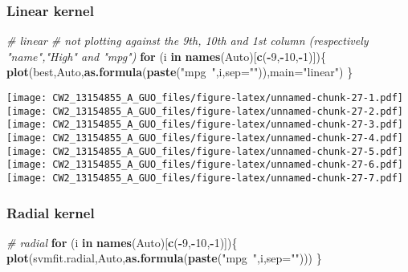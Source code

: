 \documentclass[]{article}
\newenvironment{Shaded}{\begin{snugshade}}{\end{snugshade}}
\newcommand{\KeywordTok}[1]{\textcolor[rgb]{0.13,0.29,0.53}{\textbf{#1}}}
\newcommand{\DataTypeTok}[1]{\textcolor[rgb]{0.13,0.29,0.53}{#1}}
\newcommand{\DecValTok}[1]{\textcolor[rgb]{0.00,0.00,0.81}{#1}}
\newcommand{\StringTok}[1]{\textcolor[rgb]{0.31,0.60,0.02}{#1}}
\newcommand{\CommentTok}[1]{\textcolor[rgb]{0.56,0.35,0.01}{\textit{#1}}}
\newcommand{\ControlFlowTok}[1]{\textcolor[rgb]{0.13,0.29,0.53}{\textbf{#1}}}
\newcommand{\OperatorTok}[1]{\textcolor[rgb]{0.81,0.36,0.00}{\textbf{#1}}}
\newcommand{\NormalTok}[1]{#1}
\begin{document}
\subsubsection{Linear kernel}\label{linear-kernel}

\begin{Shaded}
\begin{Highlighting}[]
\CommentTok{# linear}
\CommentTok{# not plotting against the 9th, 10th and 1st column (respectively "name","High" and "mpg")}
\ControlFlowTok{for}\NormalTok{ (i }\ControlFlowTok{in} \KeywordTok{names}\NormalTok{(Auto)[}\KeywordTok{c}\NormalTok{(}\OperatorTok{-}\DecValTok{9}\NormalTok{,}\OperatorTok{-}\DecValTok{10}\NormalTok{,}\OperatorTok{-}\DecValTok{1}\NormalTok{)])\{}
        \KeywordTok{plot}\NormalTok{(best,Auto,}\KeywordTok{as.formula}\NormalTok{(}\KeywordTok{paste}\NormalTok{(}\StringTok{"mpg~"}\NormalTok{,i,}\DataTypeTok{sep=}\StringTok{""}\NormalTok{)),}\DataTypeTok{main=}\StringTok{"linear"}\NormalTok{)}
\NormalTok{\}}
\end{Highlighting}
\end{Shaded}

\texttt{[image: CW2\_13154855\_A\_GUO\_files/figure-latex/unnamed-chunk-27-1.pdf]}
\texttt{[image: CW2\_13154855\_A\_GUO\_files/figure-latex/unnamed-chunk-27-2.pdf]}
\texttt{[image: CW2\_13154855\_A\_GUO\_files/figure-latex/unnamed-chunk-27-3.pdf]}
\texttt{[image: CW2\_13154855\_A\_GUO\_files/figure-latex/unnamed-chunk-27-4.pdf]}
\texttt{[image: CW2\_13154855\_A\_GUO\_files/figure-latex/unnamed-chunk-27-5.pdf]}
\texttt{[image: CW2\_13154855\_A\_GUO\_files/figure-latex/unnamed-chunk-27-6.pdf]}
\texttt{[image: CW2\_13154855\_A\_GUO\_files/figure-latex/unnamed-chunk-27-7.pdf]}

\subsubsection{Radial kernel}\label{radial-kernel-1}

\begin{Shaded}
\begin{Highlighting}[]
\CommentTok{# radial}
\ControlFlowTok{for}\NormalTok{ (i }\ControlFlowTok{in} \KeywordTok{names}\NormalTok{(Auto)[}\KeywordTok{c}\NormalTok{(}\OperatorTok{-}\DecValTok{9}\NormalTok{,}\OperatorTok{-}\DecValTok{10}\NormalTok{,}\OperatorTok{-}\DecValTok{1}\NormalTok{)])\{}
        \KeywordTok{plot}\NormalTok{(svmfit.radial,Auto,}\KeywordTok{as.formula}\NormalTok{(}\KeywordTok{paste}\NormalTok{(}\StringTok{"mpg~"}\NormalTok{,i,}\DataTypeTok{sep=}\StringTok{""}\NormalTok{)))}
\NormalTok{\}}
\end{Highlighting}
\end{Shaded}
\end{document}
